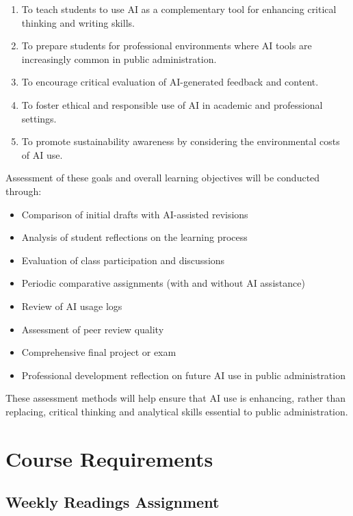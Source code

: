 \documentclass[12pt, letterpaper]{article}
\begin{document}
\begin{enumerate}
    \item To teach students to use AI as a complementary tool for enhancing critical thinking and writing skills.
    \item To prepare students for professional environments where AI tools are increasingly common in public administration.
    \item To encourage critical evaluation of AI-generated feedback and content.
    \item To foster ethical and responsible use of AI in academic and professional settings.
    \item To promote sustainability awareness by considering the environmental costs of AI use.
\end{enumerate}

\noindent Assessment of these goals and overall learning objectives will be conducted through:

\begin{itemize}
    \item Comparison of initial drafts with AI-assisted revisions
    \item Analysis of student reflections on the learning process
    \item Evaluation of class participation and discussions
    \item Periodic comparative assignments (with and without AI assistance)
    \item Review of AI usage logs
    \item Assessment of peer review quality
    \item Comprehensive final project or exam
    \item Professional development reflection on future AI use in public administration
\end{itemize}

\noindent These assessment methods will help ensure that AI use is enhancing, rather than replacing, critical thinking and analytical skills essential to public administration.

\section{Course Requirements}
\subsection*{Weekly Readings Assignment}
\end{document}
